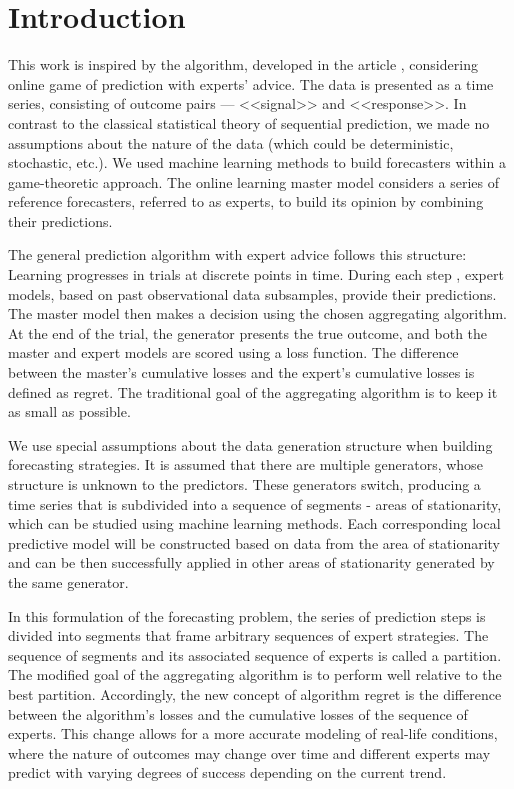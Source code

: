 \documentclass[12pt, twoside]{article}
\begin{document}
\maketitle

\section{Introduction}
This work is inspired by the algorithm, developed in the article \cite{article}, considering online game of prediction with experts' advice. The data is presented as a time series, consisting of outcome pairs --- <<signal>> and <<response>>. 
In contrast to the classical statistical theory of sequential prediction, we made no assumptions about the nature of the data (which could be deterministic, stochastic, etc.). 
We used machine learning methods to build forecasters within a game-theoretic approach.
The online learning master model considers a series of reference forecasters, referred to as experts, to build its opinion by combining their predictions.


The general prediction algorithm with expert advice follows this structure:
Learning progresses in trials at discrete points in time. 
During each step , expert models, based on past observational data subsamples, provide their predictions. 
The master model then makes a decision using the chosen aggregating algorithm. 
At the end of the trial, the generator presents the true outcome, and both the master and expert models are scored using a loss function. 
The difference between the master's cumulative losses and the expert's cumulative losses is defined as regret.
The traditional goal of the aggregating algorithm is to keep it as small as possible.

We use special assumptions about the data generation structure when building forecasting strategies. It is assumed that there are multiple generators, whose structure is unknown to the predictors. These generators switch, producing a time series that is subdivided into a sequence of segments - areas of stationarity, which can be studied using machine learning methods. Each corresponding local predictive model will be constructed based on data from the area of stationarity and can be then successfully applied in other areas of stationarity generated by the same generator.

In this formulation of the forecasting problem, the series of prediction steps is divided into segments that frame arbitrary sequences of expert strategies. The sequence of segments and its associated sequence of experts is called a partition. The modified goal of the aggregating algorithm is to perform well relative to the best partition. Accordingly, the new concept of algorithm regret is the difference between the algorithm's losses and the cumulative losses of the sequence of experts. This change allows for a more accurate modeling of real-life conditions, where the nature of outcomes may change over time and different experts may predict with varying degrees of success depending on the current trend. 
\end{document}
